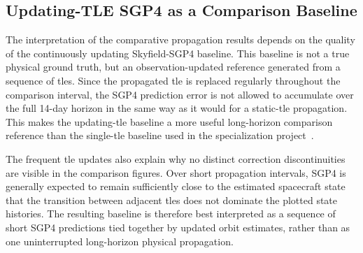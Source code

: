 \subsection{Updating-TLE SGP4 as a Comparison Baseline}

The interpretation of the comparative propagation results depends on the quality of the continuously updating Skyfield-SGP4 baseline. This baseline is not a true physical ground truth, but an observation-updated reference generated from a sequence of \glspl{tle}. Since the propagated \gls{tle} is replaced regularly throughout the comparison interval, the SGP4 prediction error is not allowed to accumulate over the full 14-day horizon in the same way as it would for a static-\gls{tle} propagation. This makes the updating-\gls{tle} baseline a more useful long-horizon comparison reference than the single-\gls{tle} baseline used in the specialization project~\cite{hystad2025}.

The frequent \gls{tle} updates also explain why no distinct correction discontinuities are visible in the comparison figures. Over short propagation intervals, SGP4 is generally expected to remain sufficiently close to the estimated spacecraft state that the transition between adjacent \glspl{tle} does not dominate the plotted state histories. The resulting baseline is therefore best interpreted as a sequence of short SGP4 predictions tied together by updated orbit estimates, rather than as one uninterrupted long-horizon physical propagation.

